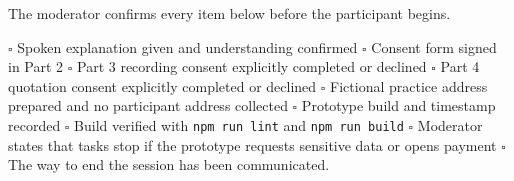 \documentclass[]{interact}
\theoremstyle{plain}
\begin{document}
The moderator confirms every item below before the participant begins.

\noindent $\square$ Spoken explanation given and understanding confirmed \quad $\square$ Consent form
signed in Part 2 \quad $\square$ Part 3 recording consent explicitly completed or declined \quad
$\square$ Part 4 quotation consent explicitly completed or declined \quad $\square$ Fictional practice
address prepared and no participant address collected \quad $\square$ Prototype build and timestamp
recorded \quad $\square$ Build verified with \texttt{npm run lint} and \texttt{npm run build} \quad
$\square$ Moderator states that tasks stop if the prototype requests sensitive data or opens payment
\quad $\square$ The way to end the session has been communicated.
\end{document}
